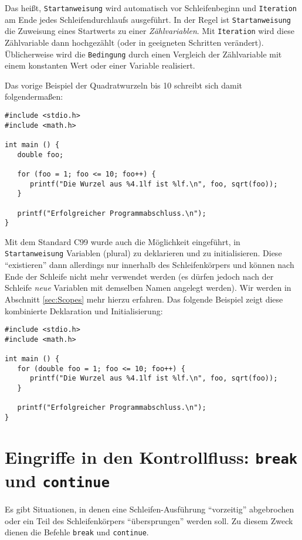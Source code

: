 Das heißt, \texttt{Startanweisung} wird automatisch vor Schleifenbeginn und \texttt{Iteration} am Ende jedes Schleifendurchlaufs ausgeführt. In der Regel ist \texttt{Startanweisung} die Zuweisung eines Startwerts zu einer \emph{Zählvariablen}. Mit \texttt{Iteration} wird diese Zählvariable dann hochgezählt (oder in geeigneten Schritten verändert). Üblicherweise wird die \texttt{Bedingung} durch einen Vergleich der Zählvariable mit einem konstanten Wert oder einer Variable realisiert.

Das vorige Beispiel der Quadratwurzeln bis 10 schreibt sich damit folgendermaßen:

\begin{codebox}
\begin{verbatim}
#include <stdio.h>
#include <math.h>

int main () {
   double foo;

   for (foo = 1; foo <= 10; foo++) {
      printf("Die Wurzel aus %4.1lf ist %lf.\n", foo, sqrt(foo));
   }

   printf("Erfolgreicher Programmabschluss.\n");
}
\end{verbatim}
\end{codebox}

Mit dem Standard C99 wurde auch die Möglichkeit eingeführt, in \texttt{Startanweisung} Variablen (plural) zu deklarieren und zu initialisieren. Diese \enquote{existieren} dann allerdings nur innerhalb des Schleifenkörpers und können nach Ende der Schleife nicht mehr verwendet werden (es dürfen jedoch nach der Schleife \emph{neue} Variablen mit demselben Namen angelegt werden). Wir werden in Abschnitt \ref{sec:Scopes} mehr hierzu erfahren. Das folgende Beispiel zeigt diese kombinierte Deklaration und Initialisierung:

\begin{codebox}
\begin{verbatim}
#include <stdio.h>
#include <math.h>

int main () {
   for (double foo = 1; foo <= 10; foo++) {
      printf("Die Wurzel aus %4.1lf ist %lf.\n", foo, sqrt(foo));
   }

   printf("Erfolgreicher Programmabschluss.\n");
}
\end{verbatim}
\end{codebox}

\section{Eingriffe in den Kontrollfluss: \texttt{break} und \texttt{continue}} \label{sec:ControlFluxAdjustment}
Es gibt Situationen, in denen eine Schleifen-Ausführung \enquote{vorzeitig} abgebrochen oder ein Teil des Schleifenkörpers \enquote{übersprungen} werden soll. Zu diesem Zweck dienen die Befehle \texttt{break} und \texttt{continue}.

